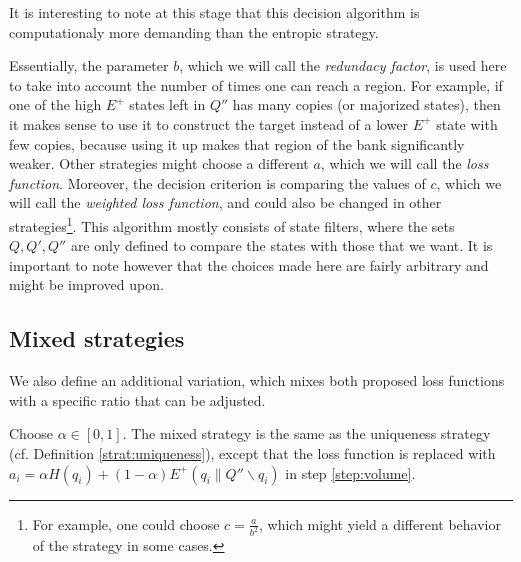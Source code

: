 \noindent It is interesting to note at this stage that this decision algorithm is computationaly more demanding than the entropic strategy.

Essentially, the parameter $b$, which we will call the \textit{redundacy factor}, is used here to take into account the number of times one can reach a region. For example, if one of the high $E^+$ states left in $Q''$ has many copies (or majorized states), then it makes sense to use it to construct the target instead of a lower $E^+$ state with few copies, because using it up makes that region of the bank significantly weaker. Other strategies might choose a different $a$, which we will call the \textit{loss function}. Moreover, the decision criterion is comparing the values of $c$, which we will call the \textit{weighted loss function}, and could also be changed in other strategies\footnote{For example, one could choose $c = \frac{a}{b^2}$, which might yield a different behavior of the strategy in some cases.}.%
This algorithm mostly consists of state filters, where the sets $Q, Q', Q''$ are only defined to compare the states with those that we want. It is important to note however that the choices made here are fairly arbitrary and might be improved upon.




\subsection{Mixed strategies}

We also define an additional variation, which mixes both proposed loss functions with a specific ratio that can be adjusted.

\begin{definition} \label{strat:mixed}
    Choose $\alpha \in [0, 1]$. The mixed strategy is the same as the uniqueness strategy (cf. Definition \ref{strat:uniqueness}), except that the loss function is replaced with $a_i = \alpha H(q_i) + (1 - \alpha) E^+(q_i \parallel Q'' \backslash q_i)$ in step \ref{step:volume}.
\end{definition}



